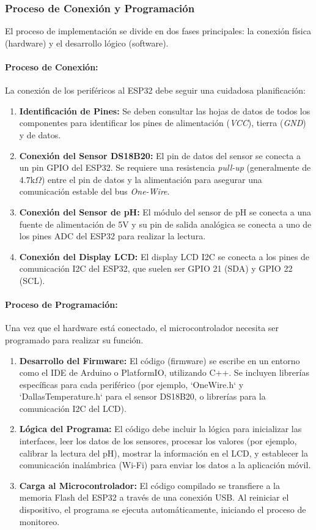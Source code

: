 \documentclass[a4paper,12pt]{article}
\begin{document}
	
	\subsubsection{Proceso de Conexión y Programación}
	El proceso de implementación se divide en dos fases principales: la conexión física (hardware) y el desarrollo lógico (software).
	
	\paragraph{Proceso de Conexión:}
	La conexión de los periféricos al ESP32 debe seguir una cuidadosa planificación:
	\begin{enumerate}
		\item \textbf{Identificación de Pines:} Se deben consultar las hojas de datos de todos los componentes para identificar los pines de alimentación (\textit{VCC}), tierra (\textit{GND}) y de datos.
		\item \textbf{Conexión del Sensor DS18B20:} El pin de datos del sensor se conecta a un pin GPIO del ESP32. Se requiere una resistencia \textit{pull-up} (generalmente de $4.7\text{k}\Omega$) entre el pin de datos y la alimentación para asegurar una comunicación estable del bus \textit{One-Wire}.
		\item \textbf{Conexión del Sensor de pH:} El módulo del sensor de pH se conecta a una fuente de alimentación de 5V y su pin de salida analógica se conecta a uno de los pines ADC del ESP32 para realizar la lectura.
		\item \textbf{Conexión del Display LCD:} El display LCD I2C se conecta a los pines de comunicación I2C del ESP32, que suelen ser GPIO 21 (SDA) y GPIO 22 (SCL).
	\end{enumerate}
	
	\paragraph{Proceso de Programación:}
	Una vez que el hardware está conectado, el microcontrolador necesita ser programado para realizar su función.
	\begin{enumerate}
		\item \textbf{Desarrollo del Firmware:} El código (firmware) se escribe en un entorno como el IDE de Arduino o PlatformIO, utilizando C++. Se incluyen librerías específicas para cada periférico (por ejemplo, `OneWire.h` y `DallasTemperature.h` para el sensor DS18B20, o librerías para la comunicación I2C del LCD).
		\item \textbf{Lógica del Programa:} El código debe incluir la lógica para inicializar las interfaces, leer los datos de los sensores, procesar los valores (por ejemplo, calibrar la lectura del pH), mostrar la información en el LCD, y establecer la comunicación inalámbrica (Wi-Fi) para enviar los datos a la aplicación móvil.
		\item \textbf{Carga al Microcontrolador:} El código compilado se transfiere a la memoria Flash del ESP32 a través de una conexión USB. Al reiniciar el dispositivo, el programa se ejecuta automáticamente, iniciando el proceso de monitoreo.
	\end{enumerate}
	
\end{document}
